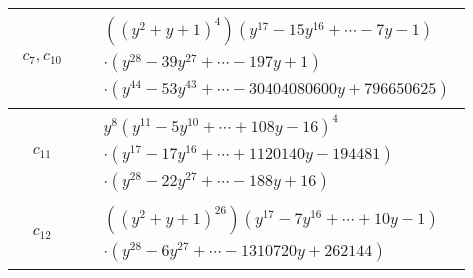 \documentclass[1p]{elsarticle_modified}
\theoremstyle{definition}
\begin{document}
\begin{tabular}{m{50pt}|m{274pt}}
\hline $$\begin{aligned}c_{7},c_{10}\end{aligned}$$&$\begin{aligned}
&((y^2+y+1)^4)(y^{17}-15 y^{16}+\cdots-7 y-1)\\
&\cdot(y^{28}-39 y^{27}+\cdots-197 y+1)\\
&\cdot(y^{44}-53 y^{43}+\cdots-30404080600 y+796650625)
\end{aligned}$\\
\hline $$\begin{aligned}c_{11}\end{aligned}$$&$\begin{aligned}
&y^8(y^{11}-5 y^{10}+\cdots+108 y-16)^{4}\\
&\cdot(y^{17}-17 y^{16}+\cdots+1120140 y-194481)\\
&\cdot(y^{28}-22 y^{27}+\cdots-188 y+16)
\end{aligned}$\\
\hline $$\begin{aligned}c_{12}\end{aligned}$$&$\begin{aligned}
&((y^2+y+1)^{26})(y^{17}-7 y^{16}+\cdots+10 y-1)\\
&\cdot(y^{28}-6 y^{27}+\cdots-1310720 y+262144)
\end{aligned}$\\
\hline
\end{tabular}
\vskip 2pc
\end{document}
